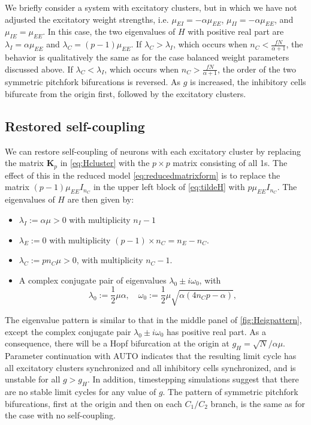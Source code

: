 \documentclass[reqno]{siamonline190516}
\newcommand{\Kvec}{\mathbf{K}}
\begin{document}
We briefly consider a system with excitatory clusters, but in which we have not adjusted the excitatory weight strengths, i.e. $\mu_{EI} = -\alpha \mu_{EE}$, $\mu_{II} = -\alpha \mu_{EE}$, and $\mu_{IE} = \mu_{EE}$. In this case, the two eigenvalues of $H$ with positive real part are $\lambda_I = \alpha \mu_{EE}$ and $\lambda_C = (p-1)\mu_{EE}$. If $\lambda_C > \lambda_I$, which occurs when $n_C < \frac{f N}{\alpha+1}$, the behavior is qualitatively the same as for the case balanced weight parameters discussed above. If  $\lambda_C < \lambda_I$, which occurs when $n_C > \frac{f N}{\alpha+1}$, the order of the two symmetric pitchfork bifurcations is reversed. As $g$ is increased, the inhibitory cells bifurcate from the origin first, followed by the excitatory clusters.

\subsection{Restored self-coupling}
We can restore self-coupling of neurons with each excitatory cluster by replacing the matrix $\Kvec_{p}$ in \cref{eq:Hcluster} with the $p\times p$ matrix consisting of all 1s. The effect of this in the reduced model \cref{eq:reducedmatrixform} is to replace the matrix $(p-1) \mu_{EE} I_{n_C}$ in the upper left block of \cref{eq:tildeH} with $p \mu_{EE} I_{n_C}$. The eigenvalues of $H$ are then given by:
\begin{itemize}
\item $\lambda_I := \alpha \mu > 0$ with multiplicity $n_I - 1$
\item $\lambda_E := 0$ with multiplicity $(p-1) \times n_C = n_E - n_C$.
\item $\lambda_C := p n_C \mu > 0$, with multiplicity $n_C - 1$.
\item A complex conjugate pair of eigenvalues $\lambda_0 \pm i \omega_0$, with 
\begin{equation*}
    \lambda_0 := \frac{1}{2}\mu \alpha, \quad 
    \omega_0 := \frac{1}{2}\mu \sqrt{ \alpha( 4 n_C p - \alpha ) },
\end{equation*}
\end{itemize}
The eigenvalue pattern is similar to that in the middle panel of \cref{fig:Heigpattern}, except the complex conjugate pair $\lambda_0 \pm i \omega_0$ has positive real part. As a consequence, there will be a Hopf bifurcation at the origin at $g_H = \sqrt{N}/\alpha \mu$. Parameter continuation with AUTO indicates that the resulting limit cycle has all excitatory clusters synchronized and all inhibitory cells synchronized, and is unstable for all $g > g_H$. In addition, timestepping simulations suggest that there are no stable limit cycles for any value of $g$. The pattern of symmetric pitchfork bifurcations, first at the origin and then on each $C_1/C_2$ branch, is the same as for the case with no self-coupling.
\end{document}
